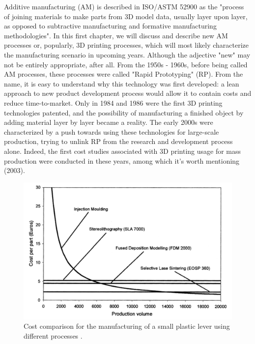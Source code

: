 Additive manufacturing (AM) is described in ISO/ASTM 52900 \cite{organization_isoastm_2015} as the "process of joining materials to make parts from 3D model data, usually layer upon layer, as opposed to subtractive manufacturing and formative manufacturing methodologies".
In this first chapter, we will discuss and describe new AM processes or, popularly, 3D printing processes, which will most likely characterize the manufacturing scenario in upcoming years. Although the adjective "new" may not be entirely appropriate, after all. From the 1950s - 1960s, before being called AM processes, these processes were called "Rapid Prototyping" (RP). From the name, it is easy to understand why this technology was first developed: a lean approach to new product development process would allow it to contain costs and reduce time-to-market. Only in 1984 and 1986 were the first 3D printing technologies patented, and the possibility of manufacturing a finished object by adding material layer by layer became a reality. The early 2000s were characterized by a push towards using these technologies for large-scale production, trying to unlink RP from the research and development process alone. Indeed, the first cost studies associated with 3D printing usage for mass production were conducted in these years, among which it's worth mentioning \citeauthor{hopkinson_analysis_2003} (2003). 
\begin{figure}[H]
    \centering
    \includegraphics[width=0.55 \textwidth]{Images/costs.png}
    \caption[Traditional processes vs AM costs.]{Cost comparison for the manufacturing of a small plastic lever using different processes \cite{hopkinson_analysis_2003}.}
    \label{fig:costs}
\end{figure}
